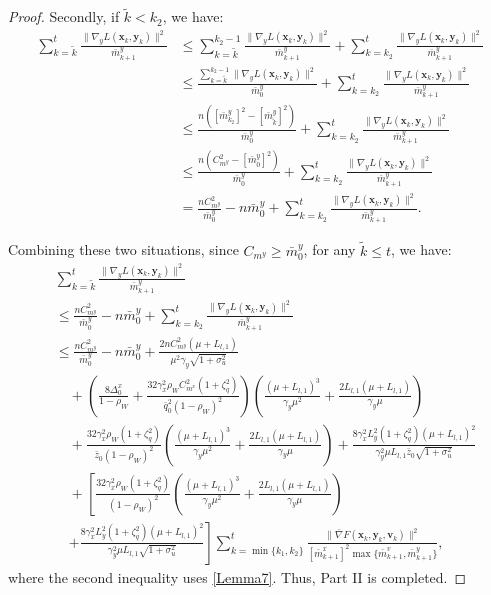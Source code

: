 \documentclass{article}
\theoremstyle{plain}
\theoremstyle{definition}
\theoremstyle{remark}
\begin{document}
\begin{proof}
Secondly, if $\tilde{k} < k_2$, we have:
\begin{align}
\sum_{k=\tilde{k}}^t \frac{\|\nabla_y L(\mathbf{x}_k, \mathbf{y}_k)\|^2}{\bar{m}^y_{k+1}}
&\leq \sum_{k=\tilde{k}}^{k_2-1}\frac{\|\nabla_y L(\mathbf{x}_k, \mathbf{y}_k)\|^2}{\bar{m}^y_{k+1}}
+ \sum_{k=k_2}^t \frac{\|\nabla_y L(\mathbf{x}_k, \mathbf{y}_k)\|^2}{\bar{m}^y_{k+1}}\nonumber \\
&\leq \frac{\sum_{k=\tilde{k}}^{k_2-1}\|\nabla_y L(\mathbf{x}_k, \mathbf{y}_k)\|^2}{\bar{m}^y_{0}}
+ \sum_{k=k_2}^t \frac{\|\nabla_y L(\mathbf{x}_k, \mathbf{y}_k)\|^2}{\bar{m}^y_{k+1}}\nonumber\\
&\leq \frac{n([\bar{m}^y_{k_2}]^2 - [\bar{m}^y_{\tilde{k}}]^2)}{\bar{m}^y_{0}} 
+ \sum_{k=k_2}^t \frac{\|\nabla_y L(\mathbf{x}_k, \mathbf{y}_k)\|^2}{\bar{m}^y_{k+1}}\nonumber \\
&\leq \frac{n(C_{m^y}^2- [\bar{m}^y_0]^2)}{\bar{m}^y_0}+\sum_{k=k_2}^t \frac{\|\nabla_y L(\mathbf{x}_k, \mathbf{y}_k)\|^2}{\bar{m}^y_{k+1}}\nonumber \\
&= \frac{nC_{m^y}^2}{\bar{m}^y_0} - n\bar{m}^y_0
+\sum_{k=k_2}^t \frac{\|\nabla_y L(\mathbf{x}_k, \mathbf{y}_k)\|^2}{\bar{m}^y_{k+1}}.\label{eq97}
\end{align}

Combining these two situations, since $C_{m^y} \geq \bar{m}^y_0$, for any $\tilde{k} \leq t$, we have:
\begin{align}
&\sum_{k=\tilde{k}}^t \frac{\|\nabla_y L(\mathbf{x}_k, \mathbf{y}_k)\|^2}{\bar{m}^y_{k+1}}\nonumber\\
&\leq \frac{nC_{m^y}^2}{\bar{m}^y_0} - n\bar{m}^y_0
+\sum_{k=k_2}^t \frac{\|\nabla_y L(\mathbf{x}_k, \mathbf{y}_k)\|^2}{\bar{m}^y_{k+1}}\nonumber \\
&\leq \frac{nC_{m^y}^2}{\bar{m}^y_0} - n\bar{m}^y_0 + \frac{ 2nC_{m^y}^2(\mu + L_{l,1})}{\mu^2\gamma_y\sqrt{1+\sigma_u^2}}\nonumber\\
&\quad+\left(\frac{8\Delta_0^x}{1-\rho_W}+\frac{32 \gamma_x^2 \rho_WC_{m^x}^2 (1 + \zeta_q^2)}{\bar{q}_0^2(1 - \rho_W)^2} \right)\left(\frac{(\mu+L_{l,1})^3}{\gamma_y\mu^2}+\frac{2L_{l,1}(\mu+L_{l,1})}{\gamma_y\mu}\right)\nonumber\\
&\quad+ \frac{32 \gamma_x^2 \rho_W(1 + \zeta_q^2)}{\bar{z}_0(1 - \rho_W)^2} \left(\frac{(\mu+L_{l,1})^3}{\gamma_y\mu^2}+\frac{2L_{l,1}(\mu+L_{l,1})}{\gamma_y\mu}\right)+\frac{8\gamma_x^2  L_y^2\left( 1 + \zeta_q^2 \right) (\mu + L_{l,1})^2}{\gamma_y^2\mu L_{l,1}\bar{z}_0\sqrt{1+\sigma_u^2}} \nonumber\\
&\quad+ \left[\frac{32 \gamma_x^2 \rho_W(1 + \zeta_q^2)}{(1 - \rho_W)^2} \left(\frac{(\mu+L_{l,1})^3}{\gamma_y\mu^2}+\frac{2L_{l,1}(\mu+L_{l,1})}{\gamma_y\mu}\right)\right.\nonumber\\
&\quad\left.+\frac{8\gamma_x^2  L_y^2\left( 1 + \zeta_q^2 \right) (\mu + L_{l,1})^2}{\gamma_y^2\mu L_{l,1}\sqrt{1+\sigma_u^2}}\right]\!\! \sum_{k=\min\{k_1,k_2\}}^t \frac{\|\bar{\nabla} F(\mathbf{x}_k,\mathbf{y}_k,\mathbf{v}_k)\|^2}{[\bar{m}^x_{k+1}]^2\max \big\{\bar{m}^v_{k+1}, \bar{m}^y_{k+1}\big\}},\label{eq98}
\end{align}
where the second inequality uses \cref{Lemma7}. Thus, Part II is completed.


\end{proof}
\end{document}
